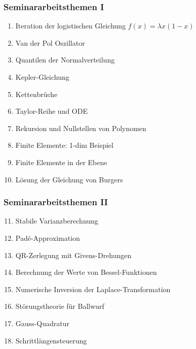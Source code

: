 %
%
%
\begin{frame}
\frametitle{Seminararbeitsthemen I}
\begin{enumerate}[<+->]
\item Iteration der logistischen Gleichung $f(x)=\lambda x(1-x)$
\item Van der Pol Oszillator
\item Quantilen der Normalverteilung
\item Kepler-Gleichung
\item Kettenbrüche
\item Taylor-Reihe und ODE
\item Rekursion und Nullstellen von Polynomen
\item Finite Elemente: 1-dim Beispiel
\item Finite Elemente in der Ebene
\item Lösung der Gleichung von Burgers
\end{enumerate}
\end{frame}

\begin{frame}
\frametitle{Seminararbeitsthemen II}
\begin{enumerate}[<+->]
\setcounter{enumi}{10}
\item Stabile Varianzberechnung
\item Padé-Approximation
\item QR-Zerlegung mit Givens-Drehungen
\item Berechnung der Werte von Bessel-Funktionen
\item Numerische Inversion der Laplace-Transformation
\item Störungstheorie für Ballwurf
\item Gauss-Quadratur
\item Schrittlängensteuerung
\end{enumerate}
\end{frame}
